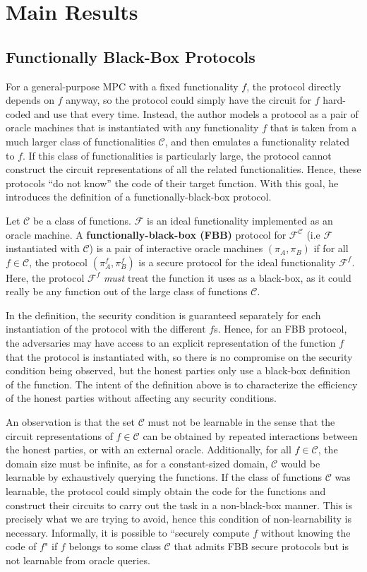 \documentclass[11pt]{article}
\theoremstyle{theorem}
\theoremstyle{theorem}
\theoremstyle{remark}
\theoremstyle{note}
\theoremstyle{plain}
\theoremstyle{definition}
\begin{document}
\section{Main Results}
\subsection{Functionally Black-Box Protocols}
For a general-purpose MPC with a fixed functionality $f$, the protocol directly depends on $f$ anyway, so the protocol could simply have the circuit for $f$ hard-coded and use that every time. Instead, the author models a protocol as a pair of oracle machines that is instantiated with any functionality $f$ that is taken from a much larger class of functionalities $\mathcal{C}$, and then emulates a functionality related to $f$. If this class of functionalities is particularly large, the protocol cannot construct the circuit representations of all the related functionalities. Hence, these protocols ``do not know'' the code of their target function. With this goal, he introduces the definition of a functionally-black-box protocol.

Let $\mathcal{C}$ be a class of functions. $\mathcal{F}$ is an ideal functionality implemented as an oracle machine. A \textbf{functionally-black-box (FBB)} protocol for $\mathcal{F}^\mathcal{C}$ (i.e  $\mathcal{F}$ instantiated with $\mathcal{C}$) is a pair of interactive oracle machines $(\pi_A, \pi_B)$  if for all $f \in \mathcal{C}$, the protocol $(\pi^f_A, \pi^f_B)$ is a secure protocol for the ideal functionality $\mathcal{F}^f$. Here, the protocol $\mathcal{F}^f$ \textit{must} treat the function it uses as a black-box, as it could really be any function out of the large class of functions $\mathcal{C}$. 

In the definition, the security condition is guaranteed separately for each instantiation of the protocol with the different $f$s. Hence, for an FBB protocol, the adversaries may have access to an explicit representation of the function $f$ that the protocol is instantiated with, so there is no compromise on the security condition being observed, but the honest parties only use a black-box definition of the function. The intent of the definition above is to characterize the efficiency of the honest parties without affecting any security conditions.

An observation is that the set $\mathcal{C}$ must not be learnable in the sense that the circuit representations of  $f \in \mathcal{C}$ can be obtained by repeated interactions between the honest parties, or with an external oracle. Additionally, for all $f \in \mathcal{C}$, the domain size must be infinite, as for a constant-sized domain, $\mathcal{C}$ would be learnable by exhaustively querying the functions. If the class of functions $\mathcal{C}$ was learnable, the protocol could simply obtain the code for the functions and construct their circuits to carry out the task in a non-black-box manner. This is precisely what we are trying to avoid, hence this condition of non-learnability is necessary. Informally, it is possible to ``securely compute $f$ without knowing the code of $f$" if $f$ belongs to some class $\mathcal{C}$ that admits FBB secure protocols but is not learnable from oracle queries.
\end{document}
